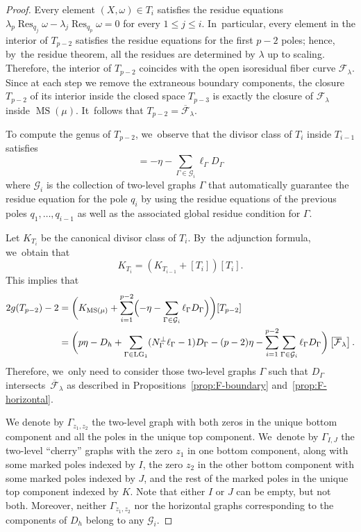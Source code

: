 \documentclass[JEP,XML,SOM,Unicode,NoFloatCountersInSection,published]{cedram}
\DeclareMathOperator\LG{LG}
\DeclareMathOperator\MS{MS}
\DeclareMathOperator\Res{Res}
\theoremstyle{definition}
\begin{document}
\begin{proof}
Every element $(X,\omega)\in T_i$ satisfies the residue equations $\lambda_{p} \Res_{q_j}\omega-\lambda_{j} \Res_{q_p}\omega=0$ for every $1\leq j \leq i$. In~particular, every element in the interior of $T_{p-2}$ satisfies the residue equations for the first $p-2$ poles; hence, by~the residue theorem, all the residues are determined by $\lambda$ up to scaling. Therefore, the interior of $T_{p-2}$ coincides with the open isoresidual fiber curve $\mathcal{F}_\lambda$. Since at each step we remove the extraneous boundary components, the closure $T_{p-2}$ of its interior inside the closed space $T_{p-3}$ is exactly the closure of $\mathcal{F}_\lambda$ inside $\MS(\mu)$. It~follows that $T_{p-2}=\overline{\mathcal F}_\lambda$.

To compute the genus of $T_{p-2}$, we~observe that the divisor class of $T_i$ inside $T_{i-1}$ satisfies
\begin{equation*}
[T_i]=-\eta-\sum_{\Gamma\in \mathcal{G}_i}\ell_{\Gamma}D_{\Gamma}
\end{equation*}
where $\mathcal{G}_i$ is the collection of two-level graphs $\Gamma$ that automatically guarantee the residue equation for the pole $q_i$ by using the residue equations of the previous poles $q_1,\ldots, q_{i-1}$ as well as the associated global residue condition for $\Gamma$.

Let $K_{T_{i}}$ be the canonical divisor class of $T_i$. By~the adjunction formula, we~obtain that
\begin{equation*}
K_{T_i} = \left(K_{T_{i-1}} + [T_i]\right)[T_i].
\end{equation*}
This implies that
\begin{align*}
2g (T_{p-2})-2 & = \biggl(K_{\MS(\mu)} + \sum_{i=1}^{p-2}\Bigl( -\eta-\sum_{\Gamma\in \mathcal{G}_i}\ell_{\Gamma}D_{\Gamma} \Bigr)\biggr)[T_{p-2}] \\
& = \biggl( p\eta -D_h + \sum_{\Gamma \in \LG_1}(N_{\Gamma}^\bot\ell_{\Gamma}-1)D_{\Gamma} - (p-2)\eta - \sum_{i=1}^{p-2}\sum_{\Gamma \in \mathcal{G}_i}\ell_{\Gamma} D_{\Gamma} \biggr)\left[\overline{\mathcal F}_\lambda\right].
\end{align*}
Therefore, we~only need to consider those two-level graphs $\Gamma$ such that $D_{\Gamma}$ intersects~$\overline{\mathcal F}_\lambda$ as described in Propositions~\ref{prop:F-boundary} and~\ref{prop:F-horizontal}.

We denote by $\Gamma_{z_1,z_2}$ the two-level graph with both zeros in the unique bottom component and all the poles in the unique top component. We~denote by $\Gamma_{I,J}$ the two-level ``cherry'' graphs with the zero $z_1$ in one bottom component, along with some marked poles indexed by $I$, the zero $z_2$ in the other bottom component with some marked poles indexed by $J$, and the rest of the marked poles in the unique top component indexed by $K$. Note that either $I$ or $J$ can be empty, but not both. Moreover, neither $\Gamma_{z_1,z_2}$ nor the horizontal graphs corresponding to the components of $D_h$ belong to any $\mathcal{G}_i$.


\end{proof}
\end{document}
